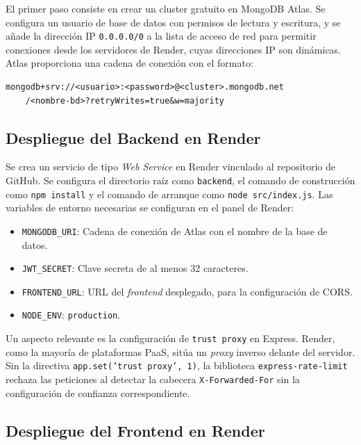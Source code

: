 El primer paso consiste en crear un cluster gratuito en MongoDB Atlas. Se configura un usuario de base de datos con permisos de lectura y escritura, y se a\~nade la direcci\'on IP \texttt{0.0.0.0/0} a la lista de acceso de red para permitir conexiones desde los servidores de Render, cuyas direcciones IP son din\'amicas. Atlas proporciona una cadena de conexi\'on con el formato:

\begin{verbatim}
mongodb+srv://<usuario>:<password>@<cluster>.mongodb.net
    /<nombre-bd>?retryWrites=true&w=majority
\end{verbatim}

\subsection{Despliegue del Backend en Render}\label{subsec:deploy-backend}

Se crea un servicio de tipo \textit{Web Service} en Render vinculado al repositorio de GitHub. Se configura el directorio ra\'iz como \texttt{backend}, el comando de construcci\'on como \texttt{npm install} y el comando de arranque como \texttt{node src/index.js}. Las variables de entorno necesarias se configuran en el panel de Render:

\begin{itemize}
    \item \texttt{MONGODB\_URI}: Cadena de conexi\'on de Atlas con el nombre de la base de datos.
    \item \texttt{JWT\_SECRET}: Clave secreta de al menos 32 caracteres.
    \item \texttt{FRONTEND\_URL}: URL del \textit{frontend} desplegado, para la configuraci\'on de CORS.
    \item \texttt{NODE\_ENV}: \texttt{production}.
\end{itemize}

Un aspecto relevante es la configuraci\'on de \texttt{trust proxy} en Express. Render, como la mayor\'ia de plataformas PaaS, sit\'ua un \textit{proxy} inverso delante del servidor. Sin la directiva \texttt{app.set('trust proxy', 1)}, la biblioteca \texttt{express-rate-limit} rechaza las peticiones al detectar la cabecera \texttt{X-Forwarded-For} sin la configuraci\'on de confianza correspondiente.

\subsection{Despliegue del Frontend en Render}\label{subsec:deploy-frontend}

